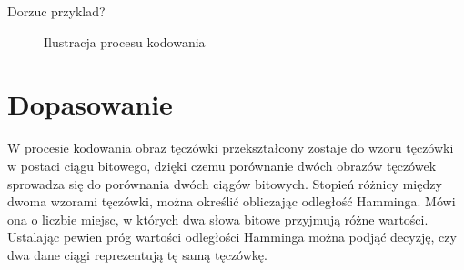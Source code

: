 Dorzuc przyklad?

\begin{figure}[!ht]
  \centering
  \caption{Ilustracja procesu kodowania}
  \label{fig:gaborEncoding}
\end{figure}

\section{Dopasowanie}

W procesie kodowania obraz tęczówki przekształcony zostaje do wzoru tęczówki w postaci ciągu bitowego,
dzięki czemu porównanie dwóch obrazów tęczówek sprowadza się do porównania dwóch ciągów bitowych.
Stopień różnicy między dwoma wzorami tęczówki, można określi\'c obliczając odległoś\'c Hamminga. Mówi
ona o liczbie miejsc, w których dwa słowa bitowe przyjmują różne wartości.
Ustalając pewien próg wartości odległości Hamminga można podją\'c decyzję, czy dwa dane ciągi
reprezentują tę samą tęczówkę.

